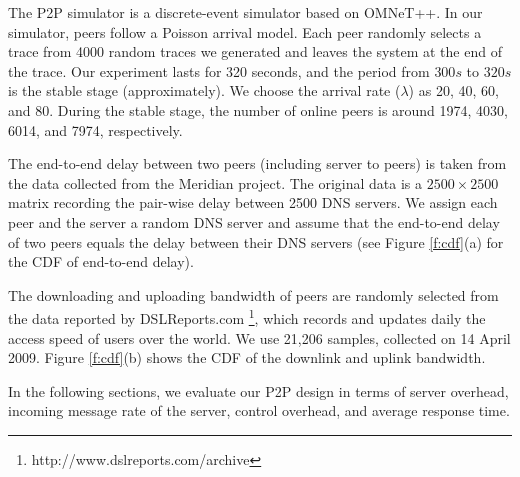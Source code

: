     The P2P simulator is a discrete-event simulator based on 
    OMNeT++.  In our simulator, peers follow a Poisson arrival 
    model.  Each peer randomly selects a trace from 4000 random 
    traces we generated and leaves the system at the end of the trace. 
    Our experiment lasts for 320 seconds, and the period from $300s$
    to $320s$ is the stable stage (approximately).
    We choose the arrival rate ($\lambda$) as 20, 40, 60, and 80. 
    During the stable stage, the number of online peers is around 1974, 4030,
    6014, and 7974, respectively.




    The end-to-end delay between two peers (including server to peers)
    is taken from the data collected from the Meridian
    \cite{meridian:wong}
    project. The original data is a $2500 \times 2500$ matrix
    recording the pair-wise delay between 2500 DNS servers. We assign
    each peer and the server a random DNS server and assume that the
    end-to-end delay of two peers equals the delay between their DNS servers
    (see Figure \ref{f:cdf}(a) for the CDF of end-to-end delay).

    The downloading and uploading bandwidth of peers are randomly
    selected from the data reported by DSLReports.com
    \footnote{http://www.dslreports.com/archive}, which records 
    and updates daily the
    access speed of users over the world. We use 21,206 samples, 
    collected on 14 April 2009.
    Figure \ref{f:cdf}(b) shows the CDF of the downlink and uplink
    bandwidth.

    In the following sections, we evaluate our P2P design in terms of
    server overhead, 
    incoming message rate of the server, 
    control overhead, and average response time.
    

